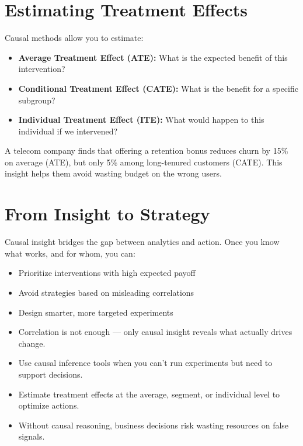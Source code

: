 \documentclass[12pt,openany, draft]{book}
\begin{document}
\section{Estimating Treatment Effects}

Causal methods allow you to estimate:
\begin{itemize}
  \item \textbf{Average Treatment Effect (ATE):} What is the expected benefit of this intervention?
  \item \textbf{Conditional Treatment Effect (CATE):} What is the benefit for a specific subgroup?
  \item \textbf{Individual Treatment Effect (ITE):} What would happen to this individual if we intervened?
\end{itemize}

\begin{examplebox}
A telecom company finds that offering a retention bonus reduces churn by 15\% on average (ATE), but only 5\% among long-tenured customers (CATE). This insight helps them avoid wasting budget on the wrong users.
\end{examplebox}

\section{From Insight to Strategy}

Causal insight bridges the gap between analytics and action. Once you know what works, and for whom, you can:
\begin{itemize}
  \item Prioritize interventions with high expected payoff
  \item Avoid strategies based on misleading correlations
  \item Design smarter, more targeted experiments
\end{itemize}

\begin{summarybox}
\begin{itemize}
  \item Correlation is not enough — only causal insight reveals what actually drives change.
  \item Use causal inference tools when you can’t run experiments but need to support decisions.
  \item Estimate treatment effects at the average, segment, or individual level to optimize actions.
  \item Without causal reasoning, business decisions risk wasting resources on false signals.
\end{itemize}
\end{summarybox}
\end{document}

